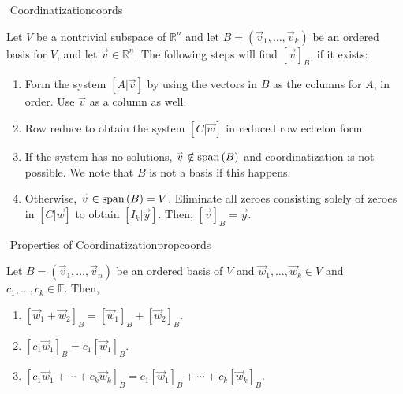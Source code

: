        \begin{theorem}{\Stop\,\,Coordinatization}{coords}

            Let \(V\) be a nontrivial subspace of \(\mathbb{R}^n\) and let \(B=(\vec{v}_1,\ldots,\vec{v}_k)\) be an ordered basis for \(V\), and let \(\vec{v}\in\mathbb{R}^n\). The following steps will find \([\vec{v}]_B\), if it exists:
            \begin{enumerate}
                \item Form the system \([A|\vec{v}]\) by using the vectors in \(B\) as the columns for \(A\), in order. Use \(\vec{v}\) as a column as well.
                \item Row reduce to obtain the system \([C|\vec{w}]\) in reduced row echelon form.
                \item If the system has no solutions, \(\overset{_{\rightharpoonup}}{v}\notin\text{span\,}(B)\) and coordinatization is not possible. We note that \(B\) is not a basis if this happens.
                \item Otherwise, \(\overset{_{\rightharpoonup}}{v}\in\text{span\,}(B)=V\). Eliminate all zeroes consisting solely of zeroes in \([C|\vec{w}]\) to obtain \([I_k|\vec{y}]\). Then, \([\vec{v}]_B=\vec{y}\).
            \end{enumerate}

        \end{theorem}
        \begin{theorem}{\Stop\,\,Properties of Coordinatization}{propcoords}

            Let \(B=(\vec{v}_1,\ldots,\vec{v}_n)\) be an ordered basis of \(V\) and \(\vec{w}_1,\ldots,\vec{w}_k\in V\) and \(c_1,\ldots,c_k\in\mathbb{F}\). Then,
            \begin{enumerate}
                \item \([\vec{w}_1+\vec{w}_2]_B=[\vec{w}_1]_B+[\vec{w}_2]_B\).
                \item \([c_1\vec{w}_1]_B=c_1[\vec{w}_1]_B\).
                \item \([c_1\vec{w}_1+\cdots+c_k\vec{w}_k]_B=c_1[\vec{w}_1]_B+\cdots+c_k[\vec{w}_k]_B\).
            \end{enumerate}
            
        \end{theorem}
